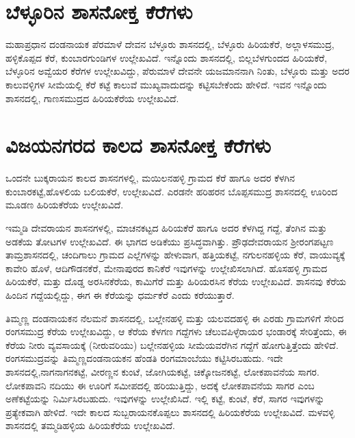 \section{ಬೆಳ್ಳೂರಿನ ಶಾಸನೋಕ್ತ ಕೆರೆಗಳು}

ಮಹಾಪ್ರಧಾನ ದಂಡನಾಯಕ ಪೆರಮಾಳೆ ದೇವನ ಬೆಳ್ಳೂರು ಶಾಸನದಲ್ಲಿ, ಬೆಳ್ಳೂರು ಹಿರಿಯಕೆರೆ, ಅಲ್ಲಾಳಸಮುದ್ರ, ಹಳ್ಳಿಕೊಪ್ಪದ ಕೆರೆ, ಕುಂಬಾರಗುಂಡಿಗಳ ಉಲ್ಲೇಖವಿದೆ. ಇನ್ನೊಂದು ಶಾಸನದಲ್ಲಿ, ಬಿಲ್ಲಬೆಳಗುಂದದ ಹಿರಿಯಕೆರೆ, ಬೆಳ್ಳೂರಿನ ಅವ್ವೆಯರ ಕೆರೆಗಳ ಉಲ್ಲೇಖವಿದ್ದು, ಪೆರುಮಾಳೆ ದೇವನೇ ಯಜಮಾನನಾಗಿ ನಿಂತು, ಬೆಳ್ಳೂರು ಮತ್ತು ಅದರ ಕಾಲುವಳ್ಳಿಗಳ ಸೀಮೆಯಲ್ಲಿ ಕೆರೆ ಕಟ್ಟೆ ಕಾಲುವೆ ಮುಖ್ಯವಾದುದನ್ನು ಕಟ್ಟಿಸಬೇಕೆಂದು ಹೇಳಿದೆ. ಇವನ ಇನ್ನೊಂದು ಶಾಸನದಲ್ಲಿ, ಗಾಣಸಮುದ್ರದ ಹಿರಿಯಕೆರೆಯ ಉಲ್ಲೇಖವಿದೆ.


\section{ವಿಜಯನಗರದ ಕಾಲದ ಶಾಸನೋಕ್ತ ಕೆರೆಗಳು}

ಒಂದನೇ ಬುಕ್ಕರಾಯನ ಕಾಲದ ಶಾಸನಗಳಲ್ಲಿ, ಮಯಿಲನಹಳ್ಳಿ ಗ್ರಾಮದ ಕೆರೆ ಹಾಗೂ ಅದರ ಕೆಳಗಿನ ಕುಂಬಾರಕಟ್ಟೆ,\break ಹೊಳಲಿಯ ಬಲಿಯಕೆರೆ, ಉಲ್ಲೇಖವಿದೆ. ಎರಡನೇ ಹರಿಹರನ ಬೊಪ್ಪಸಮುದ್ರ ಶಾಸನದಲ್ಲಿ ಊರಿಂದ ಮೂಡಣ ಹಿರಿಯಕೆರೆಯ ಉಲ್ಲೇಖವಿದೆ.

ಇಮ್ಮಡಿ ದೇವರಾಯನ ಶಾಸನಗಳಲ್ಲಿ, ಮಾಚನಕಟ್ಟದ ಹಿರಿಯಕೆರೆ ಹಾಗೂ ಅದರ ಕೆಳಗಿದ್ದ ಗದ್ದೆ, ತೆಂಗಿನ ಮತ್ತು ಅಡಕೆಯ ತೋಟಗಳ ಉಲ್ಲೇಖವಿದೆ. ಈ ಭಾಗದ ಅಡಿಕೆಯು ಪ್ರಸಿದ್ಧವಾಗಿತ್ತು. ಪ್ರೌಢದೇವರಾಯನ ಶ‍್ರೀರಂಗಪಟ್ಟಣ ತಾಮ್ರಶಾಸನದಲ್ಲಿ, ಚಂದಿಗಾಲು ಗ್ರಾಮದ ಎಲ್ಲೆಗಳನ್ನು ಹೇಳುವಾಗ, ಹತ್ತಿಯಕಟ್ಟೆ, ನಗುಲನಹಳ್ಳಿಯ ಕೆರೆ, ವಾಯುವ್ಯಕ್ಕೆ ಕಾವೇರಿ ಹೊಳೆ, ಆದಿಗೌಡನಕೆರೆ, ಮೇನಾಪುರದ ಕಾನಿಕೆರೆ ಇವುಗಳನ್ನು ಉಲ್ಲೇಖಿಸಲಾಗಿದೆ. ಹೊಸಹಳ್ಳಿ ಗ್ರಾಮದ ಹಿರಿಯಕೆರೆ, ಮತ್ತು ದೊಡ್ಡ ಅರಸಿನಕೆರೆಯ, ಕಾಮಿಗೆರೆ ಮತ್ತು ಹಿರಿಯರಸಿನ ಕೆರೆಯ ಉಲ್ಲೇಖವಿದೆ. ಶಾಸನವು ಕೆರೆಯ ಹಿಂದಿನ ಗದ್ದೆಯಲ್ಲಿದ್ದು, ಈಗ ಈ ಕೆರೆಯನ್ನು ಧರ್ಮಕೆರೆ ಎಂದು ಕರೆಯುತ್ತಾರೆ.

ತಿಮ್ಮಣ್ಣ ದಂಡನಾಯಕನ ನೆಲಮನೆ ಶಾಸನದಲ್ಲಿ, ಬಲ್ಲೇನಹಳ್ಳಿ ಮತ್ತು ಯಲವದಹಳ್ಳಿ ಈ ಎರಡು ಗ್ರಾಮಗಳಿಗೆ ಸೇರಿದ ರಂಗಸಮುದ್ರ ಕೆರೆಯ ಉಲ್ಲೇಖವಿದ್ದು, ಆ ಕೆರೆಯ ಕೆಳಗಣ ಗದ್ದೆಗಳು ಚೆಲುವಪಿಳ್ಳೆರಾಯರ ಭಂಡಾರಕ್ಕೆ ಸೇರಿತ್ತೆಂದು, ಈ ಕೆರೆಯ ನೀರು ವ್ಯವಸಾಯಕ್ಕೆ (ನೀರುವರಿಯು) ಬಲ್ಲೇನಹಳ್ಳಿಯ ಸೀಮೆಯವರೆಗಿನ ಗದ್ದೆಗೆ ಹೋಗುತ್ತಿತ್ತೆಂದು ಹೇಳಿದೆ. ರಂಗಸಮುದ್ರವನ್ನು ತಿಮ್ಮಣ್ಣದಂಡನಾಯಕನ ಹೆಂಡತಿ ರಂಗಮಾಂಬೆಯು ಕಟ್ಟಿಸಿರಬಹುದು. ಇದೇ ಶಾಸನದಲ್ಲಿ,\break ನಾಗನಾಗನಕಟ್ಟೆ, ವೀರಣ್ಣನ ಕುಂಟೆ, ಜೋಗಿಯಕಟ್ಟೆ, ಚಿಕ್ಕೋಜನಕಟ್ಟೆ, ಲೋಕಪಾವನೆಯ ಸಾಗರ. ಲೋಕಪಾವನಿ ನದಿಯು ಈ ಊರಿಗೆ ಸಮೀಪದಲ್ಲಿ ಹರಿಯುತ್ತಿದ್ದು, ಅದಕ್ಕೆ ಲೋಕಪಾವನೆಯ ಸಾಗರ ಎಂಬ ಅಣೆಕಟ್ಟೆಯನ್ನು ನಿರ್ಮಿಸಿರಬಹುದು. ಇವುಗಳನ್ನು ಉಲ್ಲೇಖಿಸಿದೆ. ಇಲ್ಲಿ ಕಟ್ಟೆ, ಕುಂಟೆ, ಕೆರೆ, ಸಾಗರ ಇವುಗಳನ್ನು ಪ್ರತ್ಯೇಕವಾಗಿ ಹೇಳಿದೆ. ಇದೇ ಕಾಲದ ಸುಬ್ಬರಾಯನಕೊಪ್ಪಲು ಶಾಸನದಲ್ಲಿ ಹಿರಿಯಕೆರೆಯ ಉಲ್ಲೇಖವಿದೆ. ಮಳವಳ್ಳಿ ಶಾಸನದಲ್ಲಿ ತಮ್ಮಡಿಹಳ್ಳಿಯ ಹಿರಿಯಕೆರೆಯ ಉಲ್ಲೇಖವಿದೆ.

